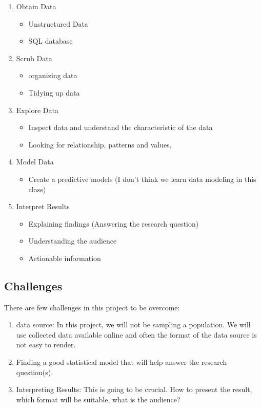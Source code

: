 \documentclass[
]{article}
\providecommand{\tightlist}{%
  \setlength{\itemsep}{0pt}\setlength{\parskip}{0pt}}
\begin{document}
\begin{enumerate}
\def\labelenumi{\arabic{enumi}.}
\tightlist
\item
  Obtain Data

  \begin{itemize}
  \tightlist
  \item
    Unstructured Data
  \item
    SQL database
  \end{itemize}
\item
  Scrub Data

  \begin{itemize}
  \tightlist
  \item
    organizing data
  \item
    Tidying up data
  \end{itemize}
\item
  Explore Data

  \begin{itemize}
  \tightlist
  \item
    Inspect data and understand the characteristic of the data
  \item
    Looking for relationship, patterns and values,
  \end{itemize}
\item
  Model Data

  \begin{itemize}
  \tightlist
  \item
    Create a predictive models (I don't think we learn data modeling in
    this class)
  \end{itemize}
\item
  Interpret Results

  \begin{itemize}
  \tightlist
  \item
    Explaining findings (Answering the research question)
  \item
    Understanding the audience
  \item
    Actionable information
  \end{itemize}
\end{enumerate}

\hypertarget{challenges}{%
\subsection{Challenges}\label{challenges}}

There are few challenges in this project to be overcome:

\begin{enumerate}
\def\labelenumi{\arabic{enumi}.}
\tightlist
\item
  data source: In this project, we will not be sampling a population. We
  will use collected data available online and often the format of the
  data source is not easy to render.
\item
  Finding a good statistical model that will help answer the research
  question(s).
\item
  Interpreting Results: This is going to be crucial. How to present the
  result, which format will be suitable, what is the audience?
\end{enumerate}
\end{document}
